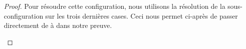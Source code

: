  \label{config-2-1}

	
\begin{proof}
	Pour résoudre cette configuration, nous utilisons la résolution de la sous-configuration  sur les trois dernières cases.
	Ceci nous permet ci-après  de passer directement de  à  dans notre preuve.
	\begin{mvts}
		\medskip
		\item  {}
		  
		\medskip
		\item  {} 
		  
		\medskip
		\item  {}
		  
		\medskip
		\item  {}
	\end{mvts}
\end{proof}
